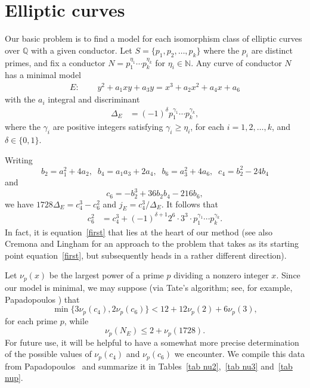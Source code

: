 

\section{Elliptic curves} \label{elliptic}

Our basic problem is to find a model for each isomorphism class of elliptic curves over $\mathbb{Q}$ with a given 
conductor. Let $S=\{ p_1, p_2, \ldots, p_k \}$ where the $p_i$ are distinct primes, and fix a conductor $N= p_1^{\eta_1} \cdots p_k^{\eta_k}$ for
$\eta_i \in \mathbb{N}$.  Any curve of conductor $N$ has a minimal 
model
\begin{align*}
E:&\phantom{=} y^2 + a_1 xy + a_3 y = x^3 + a_2 x^2 + a_4 x + a_6
\end{align*}
with the $a_i$ integral and discriminant 
\begin{align*}
\Delta_E &= (-1)^\delta p_1^{\gamma_1} \cdots p_k^{\gamma_k},
\end{align*}
where the $\gamma_i$ are positive integers satisfying $\gamma_i \geq \eta_i$, for each $i = 1, 2, \ldots, k$, and $\delta \in \{ 0, 1 \}$. 

Writing
$$
b_2 = a_1^2+4a_2, \; \; b_4 = a_1 a_3 + 2 a_4, \; \; 
b_6 = a_3^2+4a_6, \; \; 
c_4 = b_2^2-24 b_4 
$$
and
$$
c_6 = -b_2^3+ 36 b_2 b_4 -216 b_6,
$$
we have
$1728 \Delta_E = c_4^3-c_6^2$ and
$j_E = c_4^3/\Delta_E$.
It follows that
\begin{align} \label{first}
c_6^2 &= c_4^3 + (-1)^{\delta +1} 2^6 \cdot 3^3 \cdot p_1^{\gamma_1} \cdots p_k^{\gamma_k}.
\end{align}
In fact, it is equation~\eqref{first} that lies at the heart of our method (see also Cremona and 
Lingham \cite{CrLi} for an approach to the problem that takes as its starting point equation~\eqref{first}, but 
subsequently heads in a rather different direction).

Let $\nu_p(x)$ be the largest power of a prime $p$ dividing a nonzero integer $x$. Since our model is minimal, we 
may suppose  (via Tate's algorithm; see, for example, Papadopoulos \cite{Pap}) that 
$$
\min \{ 3 \nu_p (c_4), 2 \nu_p (c_6) \} < 12 + 12 \nu_p(2) + 6 \nu_p(3),
$$
for each prime $p$, while
$$
\nu_p (N_E) \leq 2 + \nu_p (1728).
$$ 
For future use, it will be helpful to have a somewhat more precise determination of the possible 
values of $\nu_p(c_4)$ and $\nu_p(c_6)$ we encounter. We compile this data from Papadopoulos~\cite{Pap} and
summarize it in Tables~\ref{tab nu2},~\ref{tab nu3} and~\ref{tab nup}.

